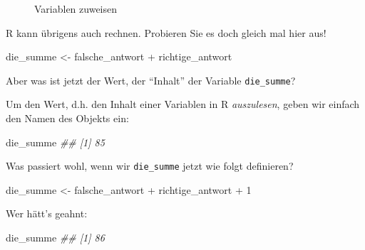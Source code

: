 \documentclass[
  letterpaper,
]{scrbook}
\newenvironment{Shaded}{\begin{snugshade}}{\end{snugshade}}
\newcommand{\DecValTok}[1]{\textcolor[rgb]{0.68,0.00,0.00}{#1}}
\newcommand{\DocumentationTok}[1]{\textcolor[rgb]{0.37,0.37,0.37}{\textit{#1}}}
\newcommand{\NormalTok}[1]{\textcolor[rgb]{0.00,0.23,0.31}{#1}}
\newcommand{\OtherTok}[1]{\textcolor[rgb]{0.00,0.23,0.31}{#1}}
\newcommand{\SpecialCharTok}[1]{\textcolor[rgb]{0.37,0.37,0.37}{#1}}
\theoremstyle{definition}
\theoremstyle{definition}
\theoremstyle{definition}
\theoremstyle{remark}
\begin{document}
\begin{figure}


\caption{\label{fig-def-vars}Variablen zuweisen}

\end{figure}%

R kann übrigens auch rechnen. Probieren Sie es doch gleich mal hier aus!

\begin{Shaded}
\begin{Highlighting}[]
\NormalTok{die\_summe }\OtherTok{\textless{}{-}}\NormalTok{ falsche\_antwort }\SpecialCharTok{+}\NormalTok{ richtige\_antwort}
\end{Highlighting}
\end{Shaded}

Aber was ist jetzt der Wert, der ``Inhalt'' der Variable
\texttt{die\_summe}?

Um den Wert, d.h. den Inhalt einer Variablen in R \emph{auszulesen},
geben wir einfach den Namen des Objekts ein:

\begin{Shaded}
\begin{Highlighting}[]
\NormalTok{die\_summe}
\DocumentationTok{\#\# [1] 85}
\end{Highlighting}
\end{Shaded}

Was passiert wohl, wenn wir \texttt{die\_summe} jetzt wie folgt
definieren?

\begin{Shaded}
\begin{Highlighting}[]
\NormalTok{die\_summe }\OtherTok{\textless{}{-}}\NormalTok{ falsche\_antwort }\SpecialCharTok{+}\NormalTok{ richtige\_antwort }\SpecialCharTok{+} \DecValTok{1}
\end{Highlighting}
\end{Shaded}

Wer hätt's geahnt:

\begin{Shaded}
\begin{Highlighting}[]
\NormalTok{die\_summe}
\DocumentationTok{\#\# [1] 86}
\end{Highlighting}
\end{Shaded}
\end{document}
